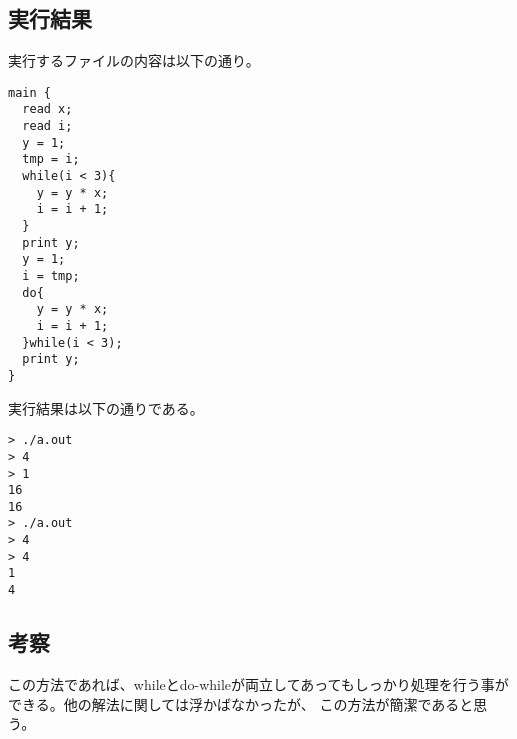 \documentclass[a4paper,11pt]{jarticle}
\begin{document}
\subsection{実行結果}
実行するファイルの内容は以下の通り。\\
\begin{verbatim}
main {
  read x;
  read i;
  y = 1;
  tmp = i;
  while(i < 3){
    y = y * x;
    i = i + 1;
  }
  print y;
  y = 1;
  i = tmp;
  do{
    y = y * x;
    i = i + 1;
  }while(i < 3);
  print y;
}
\end{verbatim}
実行結果は以下の通りである。\\
\begin{verbatim}
> ./a.out 
> 4
> 1
16
16
> ./a.out 
> 4 
> 4
1
4
\end{verbatim}
\subsection{考察}
この方法であれば、whileとdo-whileが両立してあってもしっかり処理を行う事ができる。他の解法に関しては浮かばなかったが、
この方法が簡潔であると思う。
\end{document}

